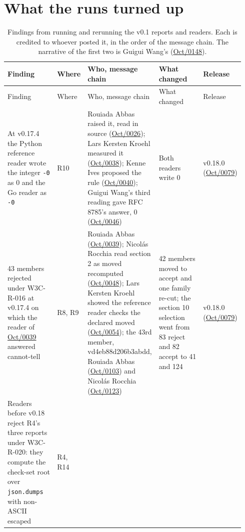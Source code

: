 \providecommand{\aevmsg}[2]{\href{https://lists.w3.org/Archives/Public/public-agent-conformance/2026#1/#2.html}{#1/#2}}
\providecommand{\aevreadrelease}{0.31.1}

\section{What the runs turned up}
\label{sec:w3c-findings}

{\footnotesize
\begin{longtable}{@{}p{0.25\linewidth}p{0.08\linewidth}p{0.29\linewidth}p{0.24\linewidth}p{0.08\linewidth}@{}}
\caption{Findings from running and rerunning the v0.1 reports and readers. Each is
credited to whoever posted it, in the order of the message chain. The narrative
of the first two is Guigui Wang's (\aevmsg{Oct}{0148}).}
\label{tab:w3c-findings}\\
\toprule
Finding & Where & Who, message chain & What changed & Release \\
\midrule
\endfirsthead
\toprule
Finding & Where & Who, message chain & What changed & Release \\
\midrule
\endhead
At v0.17.4 the Python reference reader wrote the integer \texttt{-0} as 0 and the Go reader as \texttt{-0} & R10 &
Rouiada Abbas raised it, read in source (\aevmsg{Oct}{0026}); Lars Kersten Kroehl measured it (\aevmsg{Oct}{0038});
Kenne Ives proposed the rule (\aevmsg{Oct}{0040}); Guigui Wang's third reading gave RFC 8785's answer, 0 (\aevmsg{Oct}{0046}) &
Both readers write 0 & v0.18.0 (\aevmsg{Oct}{0079}) \\
43 members rejected under W3C-R-016 at v0.17.4 on which the reader of \aevmsg{Oct}{0039} answered cannot-tell & R8, R9 &
Rouiada Abbas (\aevmsg{Oct}{0039}); Nicol\'as Rocchia read section 2 as moved recomputed (\aevmsg{Oct}{0048});
Lars Kersten Kroehl showed the reference reader checks the declared moved (\aevmsg{Oct}{0054});
the 43rd member, vd4eb88d206b3abdd, Rouiada Abbas (\aevmsg{Oct}{0103}) and Nicol\'as Rocchia (\aevmsg{Oct}{0123}) &
42 members moved to accept and one family re-cut; the section 10 selection went from 83 reject and 82 accept to 41 and 124 &
v0.18.0 (\aevmsg{Oct}{0079}) \\
Readers before v0.18 reject R4's three reports under W3C-R-020: they compute the check-set root over \texttt{json.dumps} with non-ASCII escaped & R4, R14 &

\end{longtable}}
